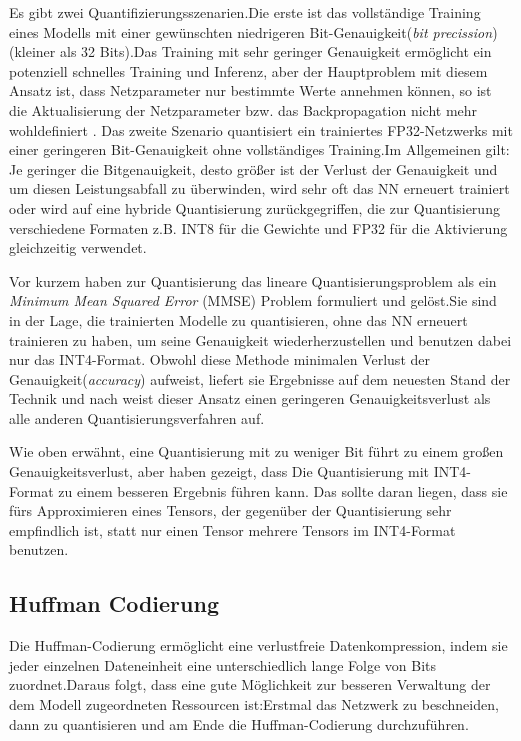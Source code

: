 \documentclass[12pt,a4paper]{scrartcl}
\numberwithin{equation}{section}
\begin{document}
Es gibt zwei Quantifizierungsszenarien.Die erste ist das vollständige Training eines Modells mit einer gewünschten niedrigeren Bit-Genauigkeit(\textit{bit precission})(kleiner als 32 Bits).Das Training mit sehr geringer Genauigkeit ermöglicht ein potenziell schnelles Training und Inferenz, aber der Hauptproblem mit diesem Ansatz ist, dass Netzparameter nur bestimmte Werte annehmen können, so ist die Aktualisierung der Netzparameter bzw. das Backpropagation nicht mehr wohldefiniert  \cite{quantizationYoni}.
Das zweite Szenario  quantisiert ein trainiertes FP32-Netzwerks mit einer geringeren Bit-Genauigkeit ohne vollständiges Training.Im Allgemeinen gilt: Je geringer die Bitgenauigkeit, desto größer ist der Verlust der Genauigkeit und um diesen Leistungsabfall zu überwinden, wird sehr oft das \ac{NN} erneuert trainiert oder wird auf eine hybride Quantisierung zurückgegriffen, die zur Quantisierung verschiedene Formaten z.B. INT8 für die Gewichte und FP32 für die Aktivierung gleichzeitig verwendet.

Vor kurzem haben \cite[Yoni et al]{quantizationYoni} zur  Quantisierung  das lineare Quantisierungsproblem als ein \textit{Minimum Mean Squared Error} (MMSE) Problem formuliert und gelöst.Sie sind in der Lage, die trainierten Modelle zu quantisieren, ohne das \ac{NN} erneuert trainieren zu haben, um seine Genauigkeit wiederherzustellen und benutzen dabei nur das INT4-Format. Obwohl diese Methode  minimalen Verlust der Genauigkeit(\textit{accuracy}) aufweist, liefert sie Ergebnisse auf dem neuesten Stand der Technik und nach \cite{quantizationYoni} weist dieser Ansatz einen geringeren Genauigkeitsverlust als alle anderen Quantisierungsverfahren auf.

Wie oben erwähnt, eine Quantisierung mit zu weniger Bit führt zu einem großen Genauigkeitsverlust, aber \cite[Yoni et al]{quantizationYoni} haben gezeigt, dass Die Quantisierung mit INT4-Format zu einem besseren Ergebnis führen kann. Das sollte daran liegen, dass sie fürs Approximieren eines Tensors, der gegenüber der Quantisierung sehr empfindlich ist, statt nur einen Tensor mehrere Tensors im INT4-Format benutzen.

\subsection{Huffman Codierung}
Die Huffman-Codierung ermöglicht eine verlustfreie Datenkompression, indem sie jeder einzelnen Dateneinheit  eine unterschiedlich lange Folge von Bits zuordnet.Daraus folgt, dass eine gute Möglichkeit zur besseren Verwaltung der dem Modell zugeordneten Ressourcen ist:Erstmal das Netzwerk zu beschneiden, dann zu quantisieren und am Ende die Huffman-Codierung durchzuführen. 
\end{document}
